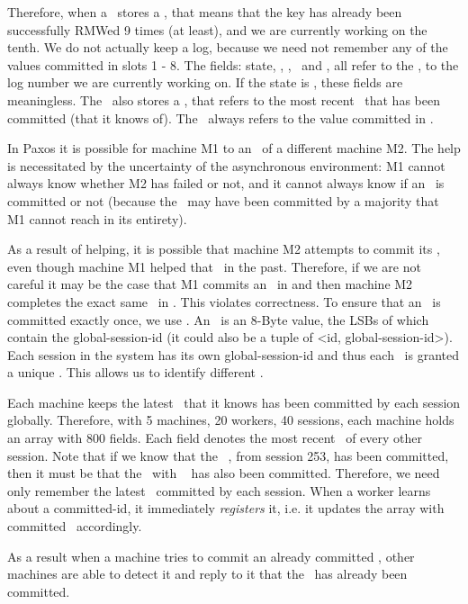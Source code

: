 Therefore, when a \kv\ stores a , that means that the key has already been successfully RMWed 9 times (at least), and we are currently working on the tenth. We do not actually keep a log, because we need not remember any of the values committed in slots 1 - 8.  
The fields: state, \propts, \accts, \accval\ and \rmw, all refer to the \logno, \ie to the log number we are currently working on. If the state is \invalid, these fields are meaningless. 
The \kv\ also stores a \comlogno, that refers to the most recent \logno\ that has been committed (that it knows of). The \val\ always refers to the value committed in \comlogno.

\custvspace
{}
In Paxos it is possible for machine M1 to  an \RMW\ of a different machine M2. 
The help is necessitated by the uncertainty of the asynchronous environment: M1 cannot always know whether M2 has failed or not, and it cannot always know if an \RMW\ is committed or not (because the \RMW\ may have been committed by a majority that M1 cannot reach in its entirety).

\custvspace
{}
As a result of helping, it is possible that machine M2 attempts to commit its \RMW, even though machine M1 helped that \RMW\ in the past. Therefore, if we are not careful it may be the case that M1 commits an \RMW\ in  and then machine M2 completes the exact same \RMW\ in .
This violates correctness. To ensure that an \RMW\ is committed exactly once, we use \rmws. An \rmw\ is an 8-Byte value, the LSBs of which contain the global-session-id (it could also be a tuple of <id, global-session-id>). Each session in the system has its own global-session-id and thus each \RMW\ is granted a unique \rmw. This allows us to identify different \RMWs.

\custvspace
{}
Each machine keeps the latest \RMW\ that it knows has been committed by each session globally.
Therefore, with 5 machines, 20 workers, 40 sessions, each machine holds an array with 800 fields. Each field denotes the most recent \rmw\ of every other session. Note that if we know that the \rmw\ <10, 253>, from session 253, has been committed, then it must be that the \RMW\ with \rmw\ <9, 253> has also been committed. Therefore, we need only remember the latest \rmw\ committed by each session. When a worker learns about a committed-id, it immediately \emph{registers} it, i.e. it updates the array with committed \RMWs\ accordingly.

As a result when a machine tries to commit an already committed \RMW, other machines are able to detect it and reply to it that the \RMW\ has already been committed.

